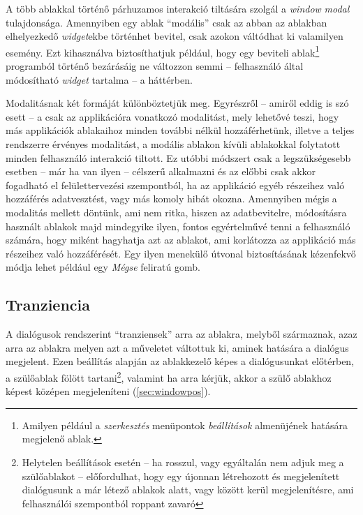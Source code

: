 A több ablakkal történő párhuzamos interakció tiltására szolgál a \textit{window} \textit{modal} tulajdonsága. Amennyiben egy ablak ``modális'' csak az abban az ablakban elhelyezkedő \textit{widget}ekbe történhet bevitel, csak azokon váltódhat ki valamilyen esemény. Ezt kihasználva biztosíthatjuk például, hogy egy beviteli ablak\footnote{Amilyen például a \textit{szerkesztés} menüpontok \textit{beállítások} almenüjének hatására megjelenő ablak.} programból történő bezárásáig ne változzon semmi -- felhasználó által módosítható \textit{widget} tartalma -- a háttérben.

Modalitásnak két formáját különböztetjük meg. Egyrészről -- amiről eddig is szó esett -- a csak az applikációra vonatkozó modalitást, mely lehetővé teszi, hogy más applikációk ablakaihoz minden további nélkül hozzáférhetünk, illetve a teljes rendszerre érvényes modalitást, a modális ablakon kívüli ablakokkal folytatott minden felhasználó interakció tiltott. Ez utóbbi módszert csak a legszükségesebb esetben -- már ha van ilyen -- célszerű alkalmazni és az előbbi csak akkor fogadható el felülettervezési szempontból, ha az applikáció egyéb részeihez való hozzáférés adatvesztést, vagy más komoly hibát okozna. Amennyiben mégis a modalitás mellett döntünk, ami nem ritka, hiszen az adatbevitelre, módosításra használt ablakok majd mindegyike ilyen, fontos egyértelművé tenni a felhasználó számára, hogy miként hagyhatja azt az ablakot, ami korlátozza az applikáció más részeihez való hozzáférését. Egy ilyen menekülő útvonal biztosításának kézenfekvő módja lehet például egy \textit{Mégse} feliratú gomb.

\subsection{Tranziencia}
\label{sec:windowtransientfor}

A dialógusok rendszerint ``tranziensek'' arra az ablakra, melyből származnak, azaz arra az ablakra melyen azt a műveletet váltottuk ki, aminek hatására a dialógus megjelent. Ezen beállítás alapján az ablakkezelő képes a dialógusunkat előtérben, a szülőablak fölött tartani\footnote{Helytelen beállítások esetén -- ha rosszul, vagy egyáltalán nem adjuk meg a szülőablakot -- előfordulhat, hogy egy újonnan létrehozott és megjelenített dialógusunk a már létező ablakok alatt, vagy között kerül megjelenítésre, ami felhasználói szempontból roppant zavaró}, valamint ha arra kérjük, akkor a szülő ablakhoz képest középen megjeleníteni (\ref{sec:windowpos}).

